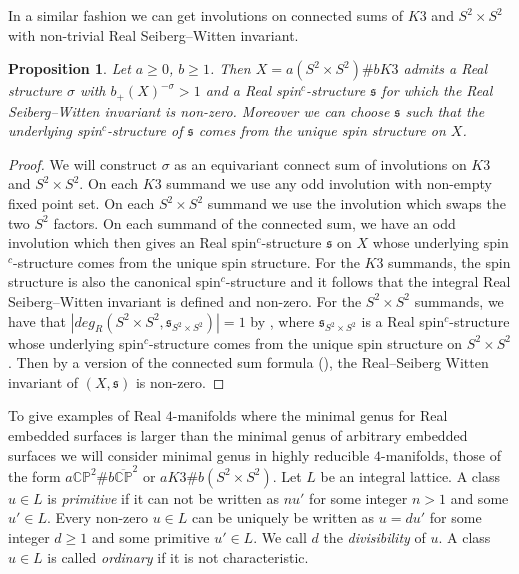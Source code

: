\documentclass{amsart}
\newtheorem{proposition}[theorem]{Proposition}
\theoremstyle{definition}
\theoremstyle{remark}
\numberwithin{equation}{section}
\begin{document}
In a similar fashion we can get involutions on connected sums of $K3$ and $S^2 \times S^2$ with non-trivial Real Seiberg--Witten invariant.

\begin{proposition}\label{prop:invol2}
Let $a \ge 0$, $b \ge 1$. Then $X = a (S^2 \times S^2) \# b K3$ admits a Real structure $\sigma$ with $b_+(X)^{-\sigma} > 1$ and a Real spin$^c$-structure $\mathfrak{s}$ for which the Real Seiberg--Witten invariant is non-zero. Moreover we can choose $\mathfrak{s}$ such that the underlying spin$^c$-structure of $\mathfrak{s}$ comes from the unique spin structure on $X$.
\end{proposition}
\begin{proof}
We will construct $\sigma$ as an equivariant connect sum of involutions on $K3$ and $S^2 \times S^2$. On each $K3$ summand we use any odd involution with non-empty fixed point set. On each $S^2 \times S^2$ summand we use the involution which swaps the two $S^2$ factors. On each summand of the connected sum, we have an odd involution which then gives an Real spin$^c$-structure $\mathfrak{s}$ on $X$ whose underlying spin$^c$-structure comes from the unique spin structure. For the $K3$ summands, the spin structure is also the canonical spin$^c$-structure and it follows that the integral Real Seiberg--Witten invariant is defined and non-zero. For the $S^2 \times S^2$ summands, we have that $| deg_R( S^2 \times S^2 , \mathfrak{s}_{S^2 \times S^2} ) | = 1$ by \cite[Proposition 6.1 (3)]{bar3}, where $\mathfrak{s}_{S^2 \times S^2}$ is a Real spin$^c$-structure whose underlying spin$^c$-structure comes from the unique spin structure on $S^2 \times S^2$. Then by a version of the connected sum formula (\cite[Theorem 9.3 (1)]{bar3}), the Real--Seiberg Witten invariant of $(X , \mathfrak{s})$ is non-zero.
\end{proof}


To give examples of Real $4$-manifolds where the minimal genus for Real embedded surfaces is larger than the minimal genus of arbitrary embedded surfaces we will consider minimal genus in highly reducible $4$-manifolds, those of the form $a \mathbb{CP}^2 \# b \overline{\mathbb{CP}}^2$ or $a K3 \# b (S^2 \times S^2)$. Let $L$ be an integral lattice. A class $u \in L$ is {\em primitive} if it can not be written as $nu'$ for some integer $n > 1$ and some $u' \in L$. Every non-zero $u \in L$ can be uniquely be written as $u = du'$ for some integer $d \ge 1$ and some primitive $u' \in L$. We call $d$ the {\em divisibility} of $u$. A class $u \in L$ is called {\em ordinary} if it is not characteristic.
\end{document}
